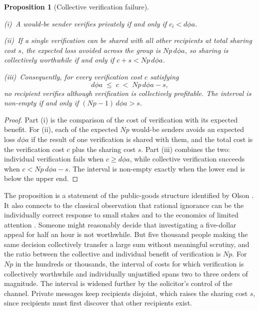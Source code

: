 \documentclass[11pt]{article}
\newtheorem{proposition}[theorem]{Proposition}
\theoremstyle{definition}
\theoremstyle{remark}
\begin{document}
\begin{proposition}[Collective verification failure]\label{prop:verify}
\par\smallskip\noindent(i)~A would-be sender verifies privately if and only if $c_i<d\phi a$.
\par\smallskip\noindent(ii)~If a single verification can be shared with all other recipients at total sharing cost $s$, the expected loss avoided across the group is $Np\,d\phi a$, so sharing is collectively worthwhile if and only if $c+s<Np\,d\phi a$.
\par\smallskip\noindent(iii)~Consequently, for every verification cost $c$ satisfying
\[
d\phi a\;\le\;c\;<\;Np\,d\phi a-s,
\]
no recipient verifies although verification is collectively profitable. The interval is non-empty if and only if $(Np-1)\,d\phi a>s$.
\end{proposition}

\begin{proof}
Part (i) is the comparison of the cost of verification with its expected benefit. For (ii), each of the expected $Np$ would-be senders avoids an expected loss $d\phi a$ if the result of one verification is shared with them, and the total cost is the verification cost $c$ plus the sharing cost $s$. Part (iii) combines the two: individual verification fails when $c\ge d\phi a$, while collective verification succeeds when $c<Np\,d\phi a-s$. The interval is non-empty exactly when the lower end is below the upper end.
\end{proof}

The proposition is a statement of the public-goods structure identified by Olson \cite{olson1965}. It also connects to the classical observation that rational ignorance can be the individually correct response to small stakes \cite{downs1957} and to the economics of limited attention \cite{sims2003}. Someone might reasonably decide that investigating a five-dollar appeal for half an hour is not worthwhile. But five thousand people making the same decision collectively transfer a large sum without meaningful scrutiny, and the ratio between the collective and individual benefit of verification is $Np$. For $Np$ in the hundreds or thousands, the interval of costs for which verification is collectively worthwhile and individually unjustified spans two to three orders of magnitude. The interval is widened further by the solicitor's control of the channel. Private messages keep recipients disjoint, which raises the sharing cost $s$, since recipients must first discover that other recipients exist.
\end{document}
